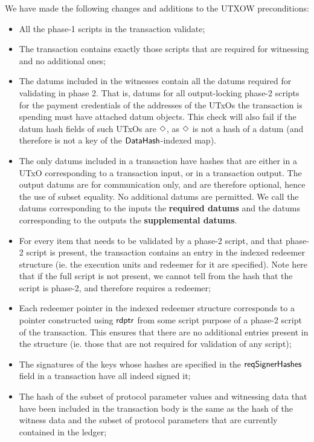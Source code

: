 We have made the following changes and additions to the UTXOW preconditions:

\begin{itemize}

\item All the phase-1 scripts in the transaction validate;

\item The transaction contains exactly those scripts that are required for witnessing and no
additional ones;

    \item The datums included in the witnesses contain all the datums required for
    validating in phase 2. That is,
    datums for all output-locking phase-2 scripts for the payment credentials of the addresses of the
    UTxOs the transaction is spending must have attached datum objects. This check will also fail if
    the datum hash fields of such UTxOs are $\Diamond$, as $\Diamond$ is not a
    hash of a datum (and therefore is not a key of the $\mathsf{DataHash}$-indexed map).

    \item The only datums included in a transaction have hashes that are either in a UTxO
    corresponding to a transaction input, or in a transaction output. The
    output datums are for communication only, and are therefore optional, hence
    the use of subset equality. No additional datums are permitted.
    We call the datums corresponding to the inputs the \textbf{required datums}
    and the datums corresponding to the outputs the \textbf{supplemental datums}.

    \item For every item that needs to be validated by a phase-2 script, and that
    phase-2 script is present, the transaction contains
      an entry in the indexed redeemer structure (ie. the execution units and redeemer for it are specified).
      Note here that if the full script is not present, we cannot tell from the hash
      that the script is phase-2, and therefore requires a redeemer;

    \item Each redeemer pointer in the indexed redeemer structure corresponds to
    a pointer constructed using $\mathsf{rdptr}$ from some script purpose of a phase-2
    script of the transaction.
    This ensures that there are no additional entries present in the structure
    (ie. those that are not required for validation of any script);

    \item The signatures of the keys whose hashes are specified in the
    $\mathsf{reqSignerHashes}$ field in a transaction
    have all indeed signed it;

    \item
    The hash of the subset of protocol parameter values and witnessing data that have been included in the
    transaction body is the same as
    the hash of the witness data and the subset of protocol parameters that are currently contained in the ledger;
\end{itemize}

